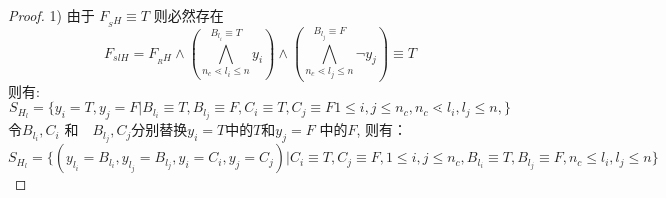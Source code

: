 \begin{proof}

1) 由于 $F_{_SH} \equiv T$ 则必然存在
\begin{equation}
F_{slH}=F_{_RH}\wedge
(\bigwedge_{n_c\lessdot l_i\leqslant n}^{B_{l_i}\equiv T} y_i)\wedge
(\bigwedge_{n_c\lessdot l_j\leqslant n}^{B_{l_j}\equiv F}\neg y_j)
 \equiv T
\end{equation}
则有:
\begin{equation}
S_{H_l}=\{y_{i}=T,y_{j}=F|
B_{l_i}\equiv T, B_{l_j}\equiv F,　
C_i\equiv T, C_j\equiv F
1\leqslant i,j\leqslant n_c,
n_c\lessdot l_i,l_j\leqslant n,
\}
\end{equation}
令$B_{l_i},C_i$ 和　$B_{l_j},C_j$分别替换$y_{i}=T$中的$T$和$y_{j}=F$ 中的$F$, 则有：
\begin{equation}\label{4:SHL}
S_{H_l}=\{(y_{l_i}=B_{l_i},y_{l_j}=B_{l_j},y_i=C_i,y_j=C_j)|
C_i\equiv T, C_j\equiv F, 1\leqslant i, j\leqslant n_c,
B_{l_i}\equiv T, B_{l_j}\equiv F, n_c\leqslant l_i, l_j\leqslant n
\}
\end{equation}


\end{proof}
